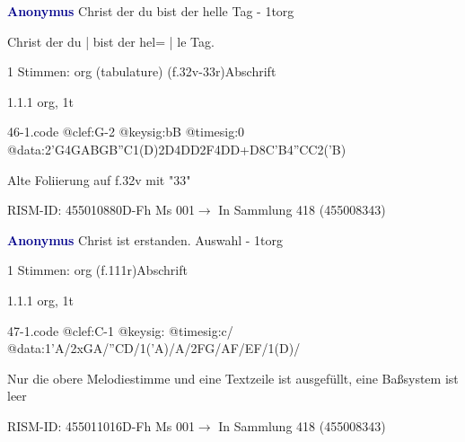 \documentclass[twocolumn, 12pt]{book}
\begin{document}
\par \vspace{16pt} \textcolor{darkblue}{\textbf{Anonymus  }}\hfillplus{\textbf{[46]}}\newline Christ der du bist der helle Tag - 1t\newline org
\par \begin{itshape}[f.32v, at left:] Christ der du | bist der hel= | le Tag.\end{itshape} 
\par \textcolor{darkblue}{}  1 Stimmen: org (tabulature)  (f.32v-33r)\newline Abschrift
\par 1.1.1  org, 1t  
\begin{filecontents*}{46-1.code}
@clef:G-2
@keysig:bB
@timesig:0
@data:2'G4GABGB''C1(D)2D4DD2F4DD+D{8C'B}4''CC2('B)
\end{filecontents*}
\newline %
\par Alte Foliierung auf f.32v mit "33"
\par RISM-ID: 455010880\newline D-Fh  Ms 001\newline $\rightarrow$ In Sammlung 418 (455008343)
      
\par \vspace{16pt} \textcolor{darkblue}{\textbf{Anonymus  }}\hfillplus{\textbf{[47]}}\newline Christ ist erstanden. Auswahl - 1t\newline org
\par \begin{itshape}\end{itshape} 
\par \textcolor{darkblue}{}  1 Stimmen: org  (f.111r)\newline Abschrift
\par 1.1.1  org, 1t\newline \begin{footnotesize}  \end{footnotesize}  
\begin{filecontents*}{47-1.code}
@clef:C-1
@keysig:
@timesig:c/
@data:1'A/2xGA/''CD/1('A)/A/2FG/AF/EF/1(D)/
\end{filecontents*}
\newline %
\par Nur die obere Melodiestimme und eine Textzeile ist ausgefüllt, eine Baßsystem ist leer
\par RISM-ID: 455011016\newline D-Fh  Ms 001\newline $\rightarrow$ In Sammlung 418 (455008343)
      
\end{document}
